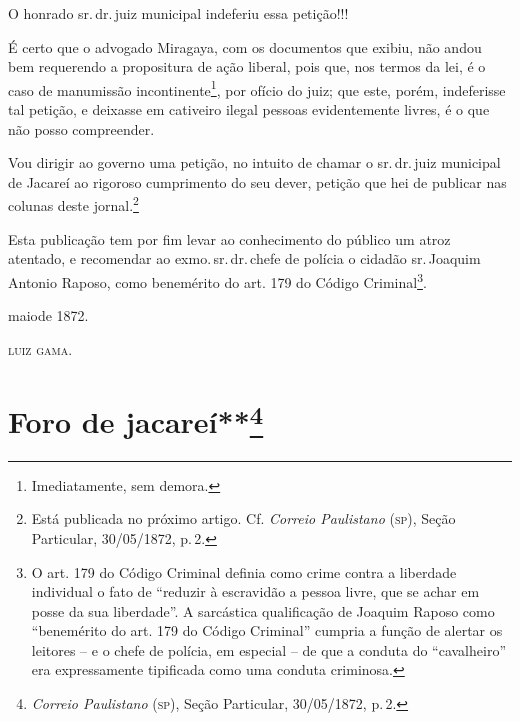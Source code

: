 O honrado sr.\,dr.\,juiz municipal indeferiu essa petição!!!

É certo que o advogado Miragaya, com os documentos que exibiu, não andou
bem requerendo a propositura de ação liberal, pois que, nos termos da
lei, é o caso de manumissão incontinente\footnote{ Imediatamente, sem
  demora.}, por ofício do juiz; que este, porém, indeferisse tal
petição, e deixasse em cativeiro ilegal pessoas evidentemente livres, é
o que não posso compreender.

Vou dirigir ao governo uma petição, no intuito de chamar o sr.\,dr.\,juiz
municipal de Jacareí ao rigoroso cumprimento do seu dever, petição que
hei de publicar nas colunas deste jornal.\footnote{ Está publicada no
  próximo artigo. Cf. \emph{Correio Paulistano} (\textsc{sp}), Seção Particular,
  30/05/1872, p.\,2.}

Esta publicação tem por fim levar ao conhecimento do público um atroz
atentado, e recomendar ao exmo.\,sr.\,dr.\,chefe de polícia o cidadão sr.\,Joaquim Antonio Raposo, como benemérito do art. 179 do Código
Criminal\footnote{ O art. 179 do Código Criminal definia como crime
  contra a liberdade individual o fato de ``reduzir à escravidão a pessoa
  livre, que se achar em posse da sua liberdade''. A sarcástica
  qualificação de Joaquim Raposo como ``benemérito do art. 179 do Código
  Criminal'' cumpria a função de alertar os leitores -- e o chefe de
  polícia, em especial -- de que a conduta do ``cavalheiro'' era
  expressamente tipificada como uma conduta criminosa.}.

maiode 1872.

\textsc{luiz gama}.

\chapter{Foro de jacareí**\footnote{\emph{Correio Paulistano} (\textsc{sp}), Seção Particular,
  30/05/1872, p.\,2.} } %

